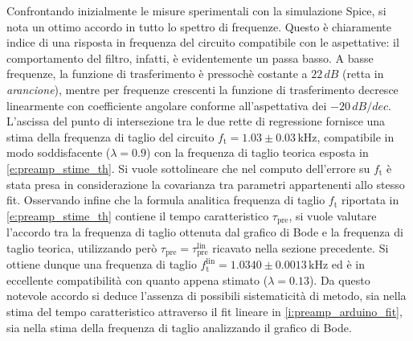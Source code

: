 \documentclass[a4paper,11pt]{article} %
\begin{document}
Confrontando inizialmente le misure sperimentali con la simulazione Spice, si nota un ottimo accordo in tutto lo spettro
di frequenze. Questo è chiaramente indice di una risposta in frequenza del circuito compatibile con le aspettative: il
comportamento del filtro, infatti, è evidentemente un passa basso. A basse frequenze, la funzione di trasferimento è
pressochè costante a $22\,\si{dB}$ (retta in \textit{arancione}), mentre per frequenze crescenti la funzione di
trasferimento decresce linearmente con coefficiente angolare conforme all'aspettativa dei $-20\,\si{dB/dec}$. L'ascissa
del punto di intersezione tra le due rette di regressione fornisce una stima della frequenza di taglio del circuito
$f_{\text{t}} = 1.03 \pm 0.03 \,\si{\kHz}$, compatibile in modo soddisfacente ($\lambda = 0.9$) con la frequenza di
taglio teorica esposta in \autoref{e:preamp_stime_th}. Si vuole sottolineare che nel computo dell'errore su
$f_{\text{t}}$ è stata presa in considerazione la covarianza tra parametri appartenenti allo stesso fit. Osservando
infine che la formula analitica frequenza di taglio $f_{\text{t}}$ riportata in \autoref{e:preamp_stime_th} contiene il
tempo caratteristico $\tau_{\text{pre}}$, si vuole valutare l'accordo tra la frequenza di taglio ottenuta dal grafico di
Bode e la frequenza di taglio teorica, utilizzando però $\tau_{\text{pre}}=\tau_{\text{pre}}^{\text{lin}}$ ricavato
nella sezione precedente. Si ottiene dunque una frequenza di taglio $f_{\text{t}}^{\text{lin}} = 1.0340 \pm 0.0013
\,\si{\kHz}$ ed è in eccellente compatibilità con quanto appena stimato ($\lambda = 0.13$). Da questo notevole accordo
si deduce l'assenza di possibili sistematicità di metodo, sia nella stima del tempo caratteristico attraverso il fit
lineare in \autoref{i:preamp_arduino_fit}, sia nella stima della frequenza di taglio analizzando il grafico di Bode. 

\end{document}
